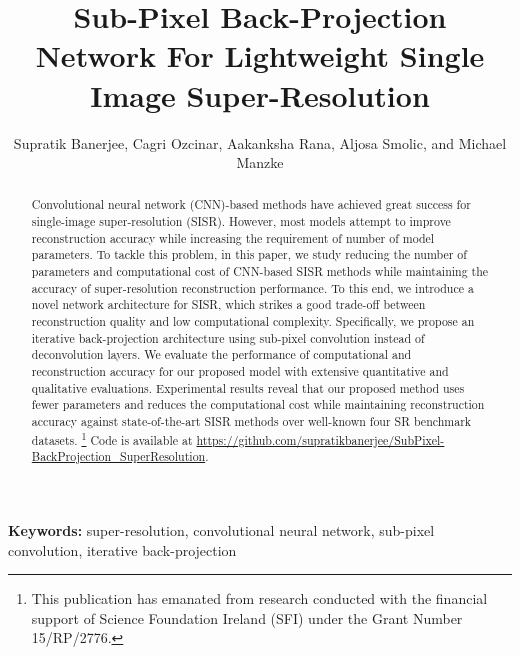 \documentclass[a4paper,11pt]{article}
\begin{document}
\title{Sub-Pixel Back-Projection Network For Lightweight Single Image Super-Resolution}



\author{Supratik Banerjee, Cagri Ozcinar, Aakanksha Rana, Aljosa Smolic, and  Michael Manzke}


\thispagestyle{empty}
\date{}










\maketitle
\begin{abstract}
Convolutional neural network (CNN)-based methods have achieved great success for single-image super-resolution (SISR). However, most models attempt to improve reconstruction accuracy while increasing the requirement of number of model parameters. To tackle this problem, in this paper, we study reducing the number of parameters and computational cost of CNN-based SISR methods while maintaining the accuracy of super-resolution reconstruction performance. To this end, we introduce a novel network architecture for SISR, which strikes a good trade-off between reconstruction quality and low computational complexity. Specifically, we propose an iterative back-projection architecture using sub-pixel convolution instead of deconvolution layers. We evaluate the performance of computational and reconstruction accuracy for our proposed model with extensive quantitative and qualitative evaluations. Experimental results reveal that our proposed method uses fewer parameters and reduces the computational cost while maintaining reconstruction accuracy against state-of-the-art SISR methods over well-known four SR benchmark datasets.
\footnote{This publication has emanated from research conducted with the financial support of Science Foundation Ireland (SFI) under the Grant Number 15/RP/2776.} Code is available at \url{https://github.com/supratikbanerjee/SubPixel-BackProjection_SuperResolution}.




\end{abstract}
\textbf{Keywords:} super-resolution, convolutional neural network, sub-pixel convolution, iterative back-projection
\end{document}

